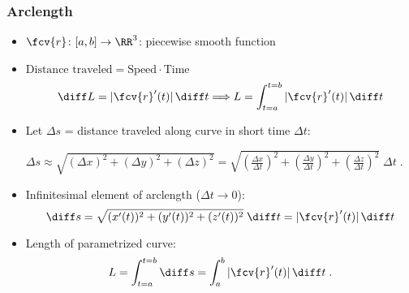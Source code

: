 \begin{frame}
\frametitle{Arclength}
\begin{itemize}
\item $\fcv{r}\colon [a,b] \to \RR^3$: piecewise smooth function
\item $\text{Distance traveled} = \text{Speed} \cdot \text{Time}$
$$\diff L = |\fcv{r}'(t)| \, \diff t \Longrightarrow L = \int_{t=a}^{t=b} |\fcv{r}'(t)| \, \diff t$$
\item<2-> Let $\Delta s$ = distance traveled along curve in short time $\Delta t$:

$\Delta s \approx \sqrt{(\Delta x)^2 + (\Delta y)^2 +
(\Delta z)^2} = \sqrt{\left(\frac{\Delta x}{\Delta t}
\right)^2 + \left(\frac{\Delta y}{\Delta t}\right)^2 +
\left(\frac{\Delta z}{\Delta t}\right)^2} \; \Delta t
\; .$
\item<3-> Infinitesimal element of arclength ($\Delta t \to 0$):
$$\diff s = \sqrt{(x'(t))^2 + (y'(t))^2 + (z'(t))^2} \;
\diff t = |\fcv{r}'(t)| \, \diff t$$
\item<4-> Length of parametrized curve:
$$L = \int_{t=a}^{t=b} \diff s = \int_a^b |\fcv{r}'(t)| \, \diff t\; .$$
\end{itemize}
\end{frame}